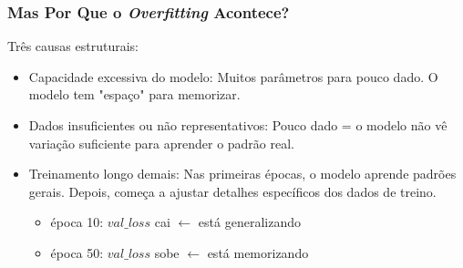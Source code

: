\documentclass[12pt, aspectratio=169]{beamer}
\begin{document}
\begin{frame}\frametitle{Mas Por Que o \textit{Overfitting} Acontece?}
Três causas estruturais:
\begin{itemize}
  \item[$\rightarrow$] Capacidade excessiva do modelo: Muitos parâmetros para pouco dado. O modelo tem "espaço" para memorizar.
  \item[$\rightarrow$] Dados insuficientes ou não representativos: Pouco dado = o modelo não vê variação suficiente para aprender o padrão real.
  \item[$\rightarrow$] Treinamento longo demais: Nas primeiras épocas, o modelo aprende padrões gerais. Depois, começa a ajustar detalhes específicos dos dados de treino.\\
\begin{itemize}
      \item[$\rightarrow$] época 10:  $val\_loss$ cai   $\leftarrow$ está generalizando
      \item[$\rightarrow$] época 50:  $val\_loss$ sobe  $\leftarrow$ está memorizando
\end{itemize}
\end{itemize}
\end{frame}
\end{document}
